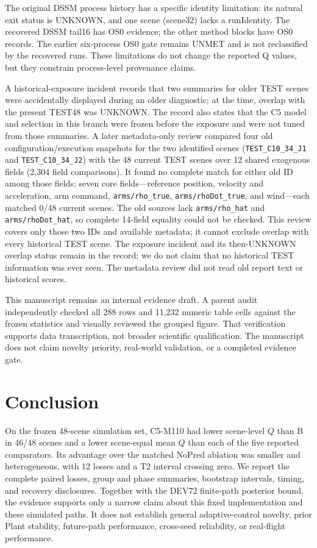 \documentclass[11pt]{article}
\begin{document}
The original DSSM process history has a specific identity limitation: its natural exit status is UNKNOWN, and one scene (scene32) lacks a runIdentity. The recovered DSSM tail16 has OS0 evidence; the other method blocks have OS0 records. The earlier six-process OS0 gate remains UNMET and is not reclassified by the recovered runs. These limitations do not change the reported Q values, but they constrain process-level provenance claims.

A historical-exposure incident records that two summaries for older TEST scenes were accidentally displayed during an older diagnostic; at the time, overlap with the present TEST48 was UNKNOWN. The record also states that the C5 model and selection in this branch were frozen before the exposure and were not tuned from those summaries. A later metadata-only review compared four old configuration/execution snapshots for the two identified scenes (\texttt{TEST\_C10\_34\_J1} and \texttt{TEST\_C10\_34\_J2}) with the 48 current TEST scenes over 12 shared exogenous fields (2,304 field comparisons). It found no complete match for either old ID among those fields; seven core fields---reference position, velocity and acceleration, arm command, \texttt{arms/rho\_true}, \texttt{arms/rhoDot\_true}, and wind---each matched 0/48 current scenes. The old sources lack \texttt{arms/rho\_hat} and \texttt{arms/rhoDot\_hat}, so complete 14-field equality could not be checked. This review covers only those two IDs and available metadata; it cannot exclude overlap with every historical TEST scene. The exposure incident and its then-UNKNOWN overlap status remain in the record; we do not claim that no historical TEST information was ever seen. The metadata review did not read old report text or historical scores.

\pagebreak
This manuscript remains an internal evidence draft. A parent audit independently checked all 288 rows and 11,232 numeric table cells against the frozen statistics and visually reviewed the grouped figure. That verification supports data transcription, not broader scientific qualification. The manuscript does not claim novelty priority, real-world validation, or a completed evidence gate.

\section{Conclusion}
On the frozen 48-scene simulation set, C5-M110 had lower scene-level $Q$ than B in 46/48 scenes and a lower scene-equal mean $Q$ than each of the five reported comparators. Its advantage over the matched NoPred ablation was smaller and heterogeneous, with 12 losses and a T2 interval crossing zero. We report the complete paired losses, group and phase summaries, bootstrap intervals, timing, and recovery disclosures. Together with the DEV72 finite-path posterior bound, the evidence supports only a narrow claim about this fixed implementation and these simulated paths. It does not establish general adaptive-control novelty, prior Plant stability, future-path performance, cross-seed reliability, or real-flight performance.



\end{document}

